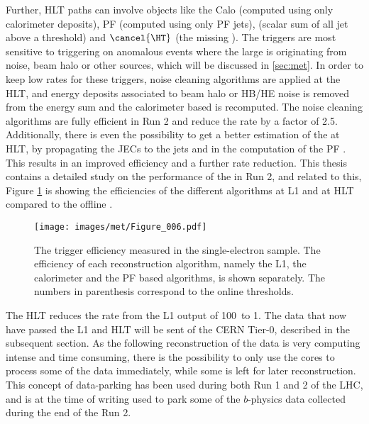 Further, HLT paths can involve objects like the Calo \ptmiss (computed using only calorimeter deposits), PF \ptmiss (computed using only PF jets), \HT (scalar sum of all jet \pt above a threshold) and $\cancel{\HT}$ (the missing \HT). 
The \ptmiss triggers are most sensitive to triggering on anomalous events where the large \ptmiss is originating from noise, beam halo or other sources, which will be discussed in \ref{sec:met}. 
In order to keep low rates for these triggers, noise cleaning algorithms are applied at the HLT, and energy deposits associated to beam halo or HB/HE noise is removed from the energy sum and the calorimeter based \ptmiss is recomputed. 
The noise cleaning algorithms are fully efficient in Run 2 and reduce the rate by a factor of 2.5. 
Additionally, there is even the possibility to get a better estimation of the \ptmiss at HLT, by propagating the JECs to the jets and in the computation of the PF \ptmiss. 
This results in an improved efficiency and a further rate reduction. 
This thesis contains a detailed study on the performance of the \ptmiss in Run 2, and related to this, Figure \ref{fig:triggerMET} is showing the efficiencies of the different \ptmiss algorithms at L1 and at HLT compared to the offline \ptmiss.   
\begin{figure}[!htp]
  \centering
   \texttt{[image: images/met/Figure\_006.pdf]}
   \caption{The \ptmiss trigger efficiency measured in the single-electron sample. The efficiency of each reconstruction algorithm, namely the L1, the calorimeter and the PF based \ptmiss algorithms, is shown separately. The numbers in parenthesis correspond to the online \ptmiss thresholds.}
   \label{fig:triggerMET}
\end{figure}                                                                         
The HLT reduces the rate from the L1 output of 100\kHz\ to 1\kHz. 
The data that now have passed the L1 and HLT will be sent of the CERN Tier-0, described in the subsequent section. 
As the following reconstruction of the data is very computing intense and time consuming, there is the possibility to only use the cores to process some of the data immediately, while some is left for later reconstruction. 
This concept of data-parking has been used during both Run 1 and 2 of the LHC, and is at the time of writing used to park some of the $b$-physics data collected during the end of the Run 2. 
